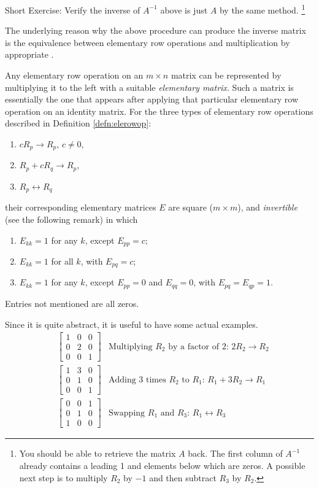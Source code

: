 Short Exercise: Verify the inverse of $A^{-1}$ above is just $A$ by the same method. \footnote{You should be able to retrieve the matrix $A$ back. The first column of $A^{-1}$ already contains a leading 1 and elements below which are zeros. A possible next step is to multiply $R_2$ by $-1$ and then subtract $R_3$ by $R_2$.}\par
The underlying reason why the above procedure can produce the inverse matrix is the equivalence between elementary row operations and multiplication by appropriate .
\begin{proper}
\label{proper:elementarymat}
Any elementary row operation on an $m \times n$ matrix can be represented by multiplying it to the left with a suitable \textit{elementary matrix}. Such a matrix is essentially the one that appears after applying that particular elementary row operation on an identity matrix. For the three types of elementary row operations described in Definition \ref{defn:elerowop}:
\begin{enumerate}
\item $cR_{p} \to R_{p}$, $c \neq 0$,
\item $R_{p} + cR_{q} \to R_{p}$,
\item $R_{p} \leftrightarrow R_{q}$
\end{enumerate}
their corresponding elementary matrices $E$ are square ($m \times m$), and \textit{invertible} (see the following remark) in which
\begin{enumerate}
\item $E_{kk} = 1$ for any $k$, except $E_{pp} = c$;
\item $E_{kk} = 1$ for all $k$, with $E_{pq} = c$;
\item $E_{kk} = 1$ for any $k$, except $E_{pp} = 0$ and $E_{qq} = 0$, with $E_{pq} = E_{qp} = 1$. 
\end{enumerate}
Entries not mentioned are all zeros.
\end{proper}
Since it is quite abstract, it is useful to have some actual examples.
\begin{align*}
&
\begin{bmatrix}
1 & 0 & 0 \\
0 & 2 & 0 \\
0 & 0 & 1
\end{bmatrix} & \text{Multiplying $R_2$ by a factor of $2$: } 2R_2 \to R_2 \\
&
\begin{bmatrix}
1 & 3 & 0 \\
0 & 1 & 0 \\
0 & 0 & 1
\end{bmatrix} & \text{Adding 3 times $R_2$ to $R_1$: } R_1 + 3R_2 \to R_1 \\
&
\begin{bmatrix}
0 & 0 & 1 \\
0 & 1 & 0 \\
1 & 0 & 0
\end{bmatrix} & \text{Swapping $R_1$ and $R_3$: } R_1 \leftrightarrow R_3 
\end{align*}
